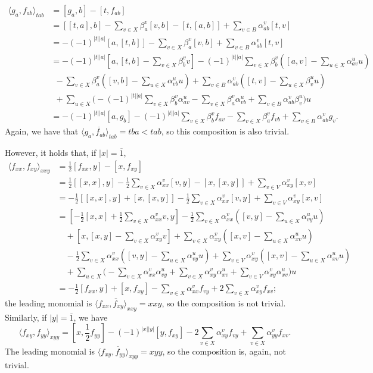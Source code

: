 \documentclass[reqno]{amsart}
\theoremstyle{definition}
\theoremstyle{remark}
\numberwithin{equation}{section}
\begin{document}
\begin{align*}
\langle g_a,f_{ab}\rangle_{tab}&=[g_a,b]-[t,f_{ab}] \\
& =[[t,a],b]-\sum_{v\in X}\beta_a^v[v,b]-[t,[a,b]]+\sum_{v\in B}\alpha_{ab}^v[t,v] \\
& =-(-1)^{|t||a|}[a,[t,b]]-\sum_{v\in X}\beta_a^v[v,b]+\sum_{v\in B}\alpha_{ab}^v[t,v] \\
& =-(-1)^{|t||a|}[a,[t,b]-\sum_{v\in X}\beta_b^vv] -(-1)^{|t||a|} \sum_{v\in X}\beta_b^v([a,v]-\sum_{u\in X}\alpha_{av}^{u}u)  \\
& \ \ -\sum_{v\in X}\beta_a^v([v,b]-\sum_{u\in X}\alpha_{vb}^{u}u)+\sum_{v\in B}\alpha_{ab}^v([t,v]-\sum_{u\in X}\beta_v^{u}u) \\
&   \ \  +\sum_{u\in X}\Big(-(-1)^{|t||a|}\sum_{v\in X}\beta_b^v\alpha_{av}^{u}-\sum_{v\in X}\beta_a^v\alpha_{vb}^{u}+\sum_{v\in B}\alpha_{ab}^v\beta_v^{u}\Big)u \\
& = -(-1)^{|t||a|}[a,g_b] -(-1)^{|t||a|} \sum_{v\in X}\beta_b^vf_{av}-\sum_{v\in X}\beta_a^vf_{vb}+\sum_{v\in B}\alpha_{ab}^vg_v.
\end{align*}
Again, we have that  $\overline{\langle g_a,f_{ab}\rangle_{tab}}=tba<tab$, so this composition is also trivial.

However, it holds that, if $|x|=\overline{1}$,
\begin{align*}
\langle f_{xx},f_{xy}\rangle_{xxy}&=\frac{1}{2}[f_{xx},y]-[x,f_{xy}] \\
& =\frac{1}{2}[[x,x],y]-\frac{1}{2}\sum_{v\in X}\alpha_{xx}^v[v,y]-[x,[x,y]]+\sum_{v\in V}\alpha_{xy}^v[x,v] \\
& =-\frac{1}{2}[[x,x],y]+[x,[x,y]]-\frac{1}{2}\sum_{v\in X}\alpha_{xx}^v[v,y]+\sum_{v\in V}\alpha_{xy}^v[x,v] \\
& = [-\frac{1}{2}[x,x]+\frac{1}{2}\sum_{v\in X}\alpha_{xx}^vv,y]-\frac{1}{2}\sum_{v\in X}\alpha_{xx}^v([v,y]-\sum_{u\in X}\alpha_{vy}^{u}u)\\
&\quad +[x,[x,y]-\sum_{v\in X}\alpha_{xy}^vv]+\sum_{v\in X}\alpha_{xy}^v([x,v]-\sum_{u\in X}\alpha_{xv}^uu)\\
&\quad -\frac{1}{2}\sum_{v\in X}\alpha_{xx}^v([v,y]-\sum_{u\in X}\alpha_{vy}^{u}u)+\sum_{v\in V}\alpha_{xy}^v([x,v] -\sum_{u\in X}\alpha_{xv}^{u}u)\\
&\quad +\sum_{u\in X}\Big(-\sum_{v\in X}\alpha_{xx}^v\alpha_{vy}^{u} +\sum_{v\in X}\alpha_{xy}^v\alpha_{xv}^u  +\sum_{v\in V}\alpha_{xy}^v\alpha_{xv}^{u}\Big)u \\
& =-\frac{1}{2}[f_{xx},y]+[x,f_{xy}]-\sum_{v\in X}\alpha_{xx}^vf_{vy}+2\sum_{v\in X}\alpha_{xy}^vf_{xv};
\end{align*}
the leading monomial is $\overline{\langle f_{xx},f_{xy}\rangle_{xxy}}=xxy$, so the composition is not trivial. Similarly, if $|y|=\overline{1}$, we have
\begin{equation*}
\langle f_{xy},f_{yy}\rangle_{xyy}=[x,\frac{1}{2}f_{yy}]-(-1)^{|x||y|}[y,f_{xy}]-2\sum_{v\in X}\alpha_{xy}^vf_{vy}+\sum_{v\in X}\alpha_{yy}^vf_{xv}.
\end{equation*}
The leading monomial is $\overline{\langle f_{xy},f_{yy}\rangle_{xyy}}=xyy$, so the composition is, again, not trivial.
\end{document}

